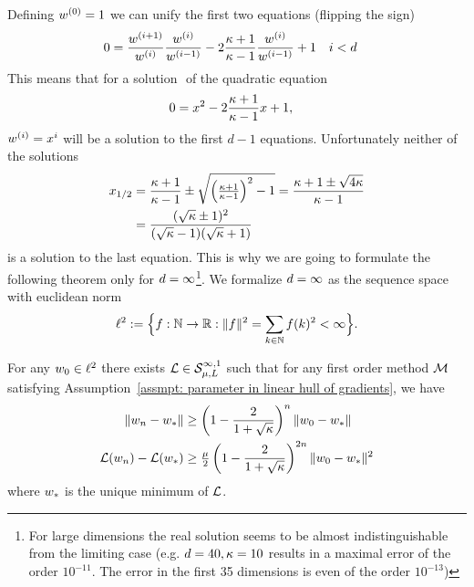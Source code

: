 Defining \(\weights^{(0)} =1\) we can unify the first two equations (flipping
the sign)
\begin{align*}
	0&= 
	\frac{\weights^{(i+1)}}{\weights^{(i)}}\frac{\weights^{(i)}}{\weights^{(i-1)}}
	- 2\frac{\condition+1}{\condition -1}\frac{\weights^{(i)}}{\weights^{(i-1)}}
	+ 1  && i <d
\end{align*}
%
This means that for a solution \(\) of the quadratic equation
\begin{align}\label{eq: coloring solution quadratic equation}
	0&= x^2 - 2\frac{\condition+1}{\condition -1}x + 1,
\end{align}
%
\(\weights^{(i)} = x^i\) will be a solution to the first \(d-1\) equations.
Unfortunately neither of the solutions
%
\begin{align*}
	x_{1/2} &= \frac{\condition+1}{\condition -1} \pm 
	\sqrt{\left(\tfrac{\condition+1}{\condition-1}\right)^2 -1}
	=\frac{\condition +1 \pm \sqrt{4\condition}}{\condition -1}\\
	&= \frac{(\sqrt{\condition}\pm 1)^2}{(\sqrt{\condition}-1)(\sqrt{\condition}+1)}
\end{align*}
%
is a solution to the last equation. This is why we are going to formulate the
following theorem only for \(\dimension=\infty\)\footnote{
	For large dimensions the real solution seems to be almost
	indistinguishable from the limiting case (e.g. \(\dimension=40,
	\condition=10\) results in a maximal error of the order \(10^{-11}\). The
	error in the first 35 dimensions is even of the order \(10^{-13}\))
}.
We formalize \(\dimension=\infty\) as the sequence space with euclidean norm
\begin{align*}
	\sequenceSpace := \Big\{
		f:\naturals \to \reals : \| f\|^2 = \sum_{k\in\naturals} f(k)^2< \infty
	\Big\}.
\end{align*}
%
\begin{theorem}
	\label{thm: strong convexity complexity bound}
	For any \(\weights_0\in\sequenceSpace\) there exists
	\(\Loss\in\strongConvex[\infty,1]{\lbound}{\ubound}\) such that for any
	first order method \(\firstOrderMethod\) satisfying Assumption~\ref{assmpt:
	parameter in linear hull of gradients}, we have
	\begin{subequations}
	\begin{align}
		\|\weights_n - \minimum\|
		&\ge \left(1-\frac2{1+\sqrt{\condition}}\right)^n \|\weights_0 - \minimum\| \\
		\Loss(\weights_n) - \Loss(\minimum)
		&\ge \tfrac{\lbound}{2}
		\left(1-\frac2{1+\sqrt{\condition}}\right)^{2n} \|\weights_0 - \minimum\|^2
	\end{align}
	\end{subequations}
	where \(\minimum\) is the unique minimum of \(\Loss\).
\end{theorem}
